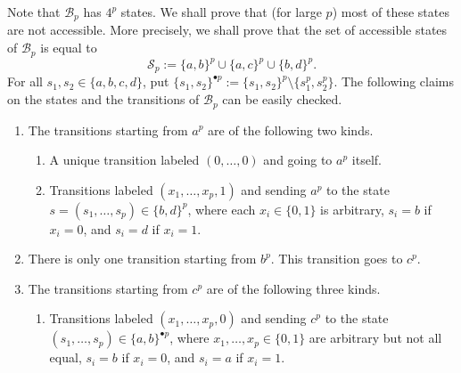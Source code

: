 \documentclass[11pt]{article}
\theoremstyle{remark}\newtheorem{remark}[theorem]{Remark}
\begin{document}
Note that $\mathcal{B}_p$ has $4^p$ states.
We shall prove that (for large $p$) most of these states are not accessible.
More precisely, we shall prove that the set of accessible states of $\mathcal{B}_p$ is equal to
\begin{equation*}
	\mathcal{S}_p := \{a, b\}^p \cup \{a, c\}^p \cup \{b, d\}^p .
\end{equation*}
For all $s_1, s_2 \in \{a, b, c, d\}$, put $\{s_1, s_2\}^{\bullet p} := \{s_1, s_2\}^p \setminus \{s_1^p, s_2^p\}$.
The following claims on the states and the transitions of $\mathcal{B}_p$ can be easily checked.
\vspace{0.5em}
\begin{enumerate}[label={\footnotesize(t\arabic*)},labelindent=1em,itemsep=0.5em,topsep=0.5em]
	\setlength\itemsep{0.5em}
	
	\item\label{ite:t1} The transitions starting from $a^p$ are of the following two kinds.
	\vspace{0.5em}
	\begin{enumerate}[label={\footnotesize(t1\roman*)},labelindent=1em,itemsep=0.5em,topsep=0.5em]
		\setlength\itemsep{0.5em}
		
		\item A unique transition labeled $(0, \dots, 0)$ and going to $a^p$ itself.
		
		\item Transitions labeled $(x_1, \dots, x_p, 1)$ and sending $a^p$ to the state $s = (s_1, \dots, s_p) \in \{b, d\}^p$, where each $x_i \in \{0, 1\}$ is arbitrary, $s_i = b$ if $x_i = 0$, and $s_i = d$ if $x_i = 1$.
	\end{enumerate}
	
	\item\label{ite:t2} There is only one transition starting from $b^p$.
	This transition goes to $c^p$.
	
	\item\label{ite:t3} The transitions starting from $c^p$ are of the following three kinds.
	\vspace{0.5em}
	\begin{enumerate}[label={\footnotesize(t3\roman*)},labelindent=1em,itemsep=0.5em,topsep=0.5em]
		\setlength\itemsep{0.5em}
		
		\item Transitions labeled $(x_1, \dots, x_p, 0)$ and sending $c^p$ to the state $(s_1, \dots, s_p) \in \{a, b\}^{\bullet p}$, where
		$x_1, \dots, x_p \in \{0,1\}$ are arbitrary but not all equal, $s_i = b$ if $x_i = 0$, and $s_i = a$ if $x_i = 1$.
		

\end{enumerate}
\end{enumerate}
\end{document}
